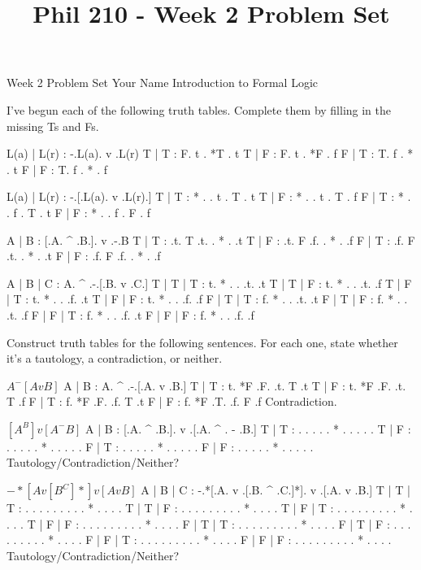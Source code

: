 
\title{Phil 210 - Week 2 Problem Set}

\heading
Week 2 Problem Set
Your Name
Introduction to Formal Logic
\endheading

I've begun each of the following truth tables. Complete them by filling in the missing Ts and Fs.

\problems
{}
\truthtable
 L(a) | L(r) : -.L(a).  v  .L(r)
\truthtableline
  T   |  T   : F. t  . *T  . t
  T   |  F   : F. t  . *F  . f
  F   |  T   : T. f  . *   . t
  F   |  F   : T. f  . *   . f
\endtruthtable

\truthtable
 L(a) | L(r) :  -.[.L(a). v .L(r).]
\truthtableline
  T   |  T   : * . . t  . T . t
  T   |  F   : * . . t  . T . f
  F   |  T   : * . . f  . T . t
  F   |  F   : * . . f  . F . f
\endtruthtable

\truthtable
 A | B : [.A. ^ .B.].  v  .-.B
\truthtableline
 T | T :  .t. T .t. . *   . .t
 T | F :  .t. F .f. . *   . .f
 F | T :  .f. F .t. . *   . .t
 F | F :  .f. F .f. . *   . .f
\endtruthtable

\truthtable
 A | B | C : A.  ^  .-.[.B. v .C.]
\truthtableline
 T | T | T : t. *   . . .t.   .t
 T | T | F : t. *   . . .t.   .f
 T | F | T : t. *   . . .f.   .t
 T | F | F : t. *   . . .f.   .f
 F | T | T : f. *   . . .t.   .t
 F | T | F : f. *   . . .t.   .f
 F | F | T : f. *   . . .f.   .t
 F | F | F : f. *   . . .f.   .f
\endtruthtable

\endproblems
\pagebreak

Construct truth tables for the following sentences. For each one, state whether it's a tautology, a contradiction, or neither.

\problems
{}
$ A ^ -[A v B] $
	\answer
	\truthtable
	 A | B : A.  ^  .-.[.A. v .B.]
	\truthtableline
	 T | T : t. *F  .F. .t. T .t
	 T | F : t. *F  .F. .t. T .f
	 F | T : f. *F  .F. .f. T .t
	 F | F : f. *F  .T. .f. F .f
	\endtruthtable
	Contradiction.
	\endanswer

$ [A ^ B] v [A ^ -B] $
	\answer
	\truthtable
	 A | B : [.A. ^ .B.].  v  .[.A. ^ . - .B.]
	\truthtableline
	 T | T :  . .   . . . *   . . .   .   . 
	 T | F :  . .   . . . *   . . .   .   . 
	 F | T :  . .   . . . *   . . .   .   . 
	 F | F :  . .   . . . *   . . .   .   . 
	\endtruthtable
	Tautology/Contradiction/Neither?
	\endanswer

$ -*[A v [B ^ C]*] v [A v B] $
	\answer
	\truthtable
	 A | B | C : -.*[.A. v .[.B. ^ .C.]*].  v  .[.A. v .B.]
	\truthtableline
	 T | T | T :  .  . .   . . .   . .   . *   . . .   . 
	 T | T | F :  .  . .   . . .   . .   . *   . . .   . 
	 T | F | T :  .  . .   . . .   . .   . *   . . .   . 
	 T | F | F :  .  . .   . . .   . .   . *   . . .   . 
	 F | T | T :  .  . .   . . .   . .   . *   . . .   . 
	 F | T | F :  .  . .   . . .   . .   . *   . . .   . 
	 F | F | T :  .  . .   . . .   . .   . *   . . .   . 
	 F | F | F :  .  . .   . . .   . .   . *   . . .   . 
	\endtruthtable
	Tautology/Contradiction/Neither?
	\endanswer

